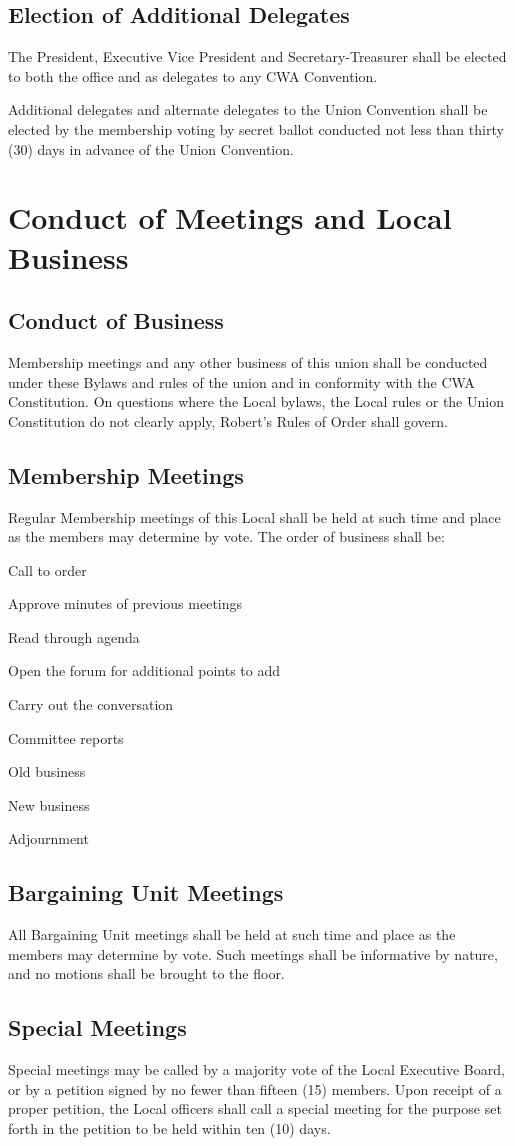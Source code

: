 \documentclass[11pt]{article}
\newcommand{\article}[1]{\vspace{.50cm}\section{#1}}
\newcommand{\articlesection}[1]{\vspace{.25cm}\subsection{#1}}
\begin{document}
\articlesection{Election of Additional Delegates}
The President, Executive Vice President and Secretary-Treasurer shall be elected to both the office and as delegates to any CWA Convention.

Additional delegates and alternate delegates to the Union Convention shall be elected by
the membership voting by secret ballot conducted not less than thirty (30) days
in advance of the Union Convention.

\article{Conduct of Meetings and Local Business}\label{conduct-of-meetings}
\articlesection{Conduct of Business}
Membership meetings and any other business of this union shall be conducted under these Bylaws and rules of the union and in conformity with the CWA Constitution. On questions where the Local bylaws, the Local rules or the Union Constitution do not clearly apply, Robert's Rules of Order shall govern.

\articlesection{Membership Meetings}
Regular Membership meetings of this Local shall be held at such time and place as the members may determine by vote. The order of business shall be:

\begin{numberlist}
\item Call to order
\item Approve minutes of previous meetings
\item Read through agenda
\item Open the forum for additional points to add
\item Carry out the conversation
\item Committee reports
\item Old business
\item New business
\item Adjournment
\end{numberlist}

\articlesection{Bargaining Unit Meetings}
All Bargaining Unit meetings shall be held at such time and place as the members may determine by vote. Such meetings shall be informative by nature, and no motions shall be brought to the floor.

\articlesection{Special Meetings}\label{special-meetings}
Special meetings may be called by a majority vote of the Local Executive Board, or by a petition signed by no fewer than fifteen (15) members. Upon receipt of a proper petition, the Local officers shall call a special meeting for the purpose set forth in the petition to be held within ten (10) days.
\end{document}
